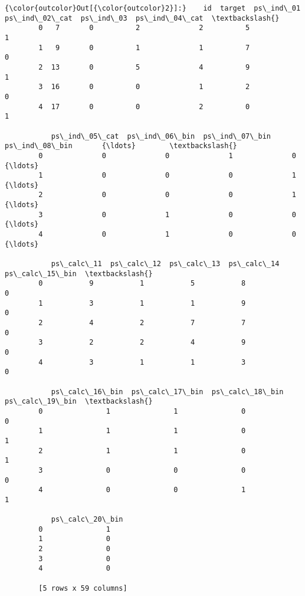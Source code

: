 \documentclass[11pt]{article}
\begin{document}
\begin{Verbatim}[commandchars=\\\{\}]
{\color{outcolor}Out[{\color{outcolor}2}]:}    id  target  ps\_ind\_01  ps\_ind\_02\_cat  ps\_ind\_03  ps\_ind\_04\_cat  \textbackslash{}
        0   7       0          2              2          5              1   
        1   9       0          1              1          7              0   
        2  13       0          5              4          9              1   
        3  16       0          0              1          2              0   
        4  17       0          0              2          0              1   
        
           ps\_ind\_05\_cat  ps\_ind\_06\_bin  ps\_ind\_07\_bin  ps\_ind\_08\_bin       {\ldots}        \textbackslash{}
        0              0              0              1              0       {\ldots}         
        1              0              0              0              1       {\ldots}         
        2              0              0              0              1       {\ldots}         
        3              0              1              0              0       {\ldots}         
        4              0              1              0              0       {\ldots}         
        
           ps\_calc\_11  ps\_calc\_12  ps\_calc\_13  ps\_calc\_14  ps\_calc\_15\_bin  \textbackslash{}
        0           9           1           5           8               0   
        1           3           1           1           9               0   
        2           4           2           7           7               0   
        3           2           2           4           9               0   
        4           3           1           1           3               0   
        
           ps\_calc\_16\_bin  ps\_calc\_17\_bin  ps\_calc\_18\_bin  ps\_calc\_19\_bin  \textbackslash{}
        0               1               1               0               0   
        1               1               1               0               1   
        2               1               1               0               1   
        3               0               0               0               0   
        4               0               0               1               1   
        
           ps\_calc\_20\_bin  
        0               1  
        1               0  
        2               0  
        3               0  
        4               0  
        
        [5 rows x 59 columns]
\end{Verbatim}
            
\end{document}
